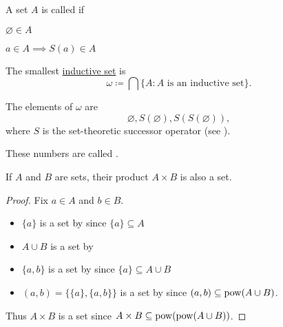\begin{definition}\label{def:inductive_set}
  A set \( A \) is called  if
  \begin{thmenum}
    \item \( \varnothing \in A \)
    \item \( a \in A \implies S(a) \in A \)
  \end{thmenum}
\end{definition}

\begin{definition}\label{def:smallest_inductive_set}
  The smallest \hyperref[def:inductive_set]{inductive set} is
  \begin{equation*}
    \omega \coloneqq \bigcap \{ A \colon A \text{ is an inductive set} \}.
  \end{equation*}

  The elements of \( \omega \) are
  \begin{equation*}
    \varnothing, S(\varnothing), S(S(\varnothing)),
  \end{equation*}
  where \( S \) is the set-theoretic successor operator (see ).

  These numbers are called .
\end{definition}

\begin{proposition}\label{thm:binary_cartesian_product_is_set}
  If \( A \) and \( B \) are sets, their product \( A \times B \) is also a set.
\end{proposition}
\begin{proof}
  Fix \( a \in A \) and \( b \in B \).
  \begin{itemize}
    \item \( \{ a \} \) is a set by  since \( \{ a \} \subseteq A \)
    \item \( A \cup B \) is a set by 
    \item \( \{ a, b \} \) is a set by  since \( \{ a \} \subseteq A \cup B \)
    \item \( (a, b) = \{ \{ a \}, \{ a, b \} \} \) is a set by  since \( (a, b) \subseteq \operatorname{pow}(A \cup B) \).
  \end{itemize}

  Thus \( A \times B \) is a set since \( A \times B \subseteq \operatorname{pow}(\operatorname{pow}(A \cup B)) \).
\end{proof}
